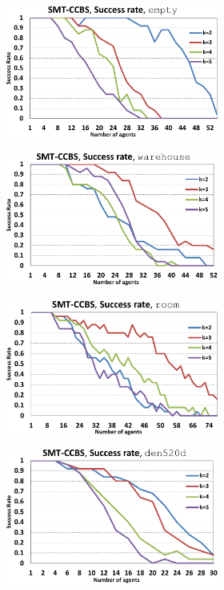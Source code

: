 \documentclass[review]{elsarticle}
\begin{document}
\begin{figure}[h]
\centering
\begin{subfigure}
    \centering
    \begin{subfigure}
        \centering
        \includegraphics[width=0.45\linewidth]{mapfr-sr-plot-smtcbs-empty.pdf}
    \end{subfigure}\hspace{0.025\linewidth}
    \begin{subfigure}
        \centering
        \includegraphics[width=0.45\linewidth]{mapfr-sr-plot-smtcbs-warehouse.pdf}
    \end{subfigure}%
\end{subfigure}

\begin{subfigure}
    \centering

    \begin{subfigure}
        \centering
        \includegraphics[width=0.45\linewidth]{mapfr-sr-plot-smtcbs-room.pdf}
    \end{subfigure}\hspace{0.025\linewidth}
    \begin{subfigure}
        \centering
        \includegraphics[width=0.45\linewidth]{mapfr-sr-plot-smtcbs-den520d.pdf}
    \end{subfigure}%
\end{subfigure}


\end{figure}
\end{document}
